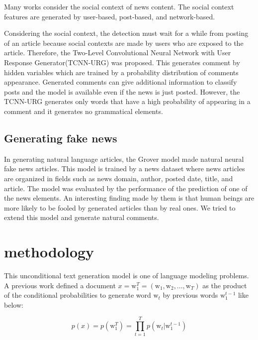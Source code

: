 \documentclass[conference]{IEEEtran}
\begin{document}
Many works consider the social context of news content.
The social context features are generated by user-based\cite{Castillo:2011:ICT:1963405.1963500,8397048,DBLP:journals/corr/abs-1904-13355}, 
post-based\cite{Yang2019UnsupervisedFN,Tacchini2017SomeLI,Jin:2016:NVE:3016100.3016318},
 and network-based\cite{Wu:2018:TFF:3159652.3159677,DBLP:journals/corr/abs-1902-06673}.

Considering the social context, the detection must wait for a while from posting of an article because social contexts are made by users who are exposed to the article.
Therefore, the Two-Level Convolutional Neural Network with User Response Generator(TCNN-URG) was proposed\cite{ijcai2018-533}.
This generates comment by hidden variables which are trained by a probability distribution of comments appearance.
Generated comments can give additional information to classify posts and the model is available even if the news is just posted.
However, the TCNN-URG generates only words that have a high probability of appearing in a comment and it generates no grammatical elements.

\subsection{Generating fake news}
\label{subsec:generate}
In generating natural language articles, the Grover model made natural neural fake news articles\cite{NIPS2019_9106}.
This model is trained by a news dataset where news articles are organized in fields such as news domain, author, posted date, title, and article.
The model was evaluated by the performance of the prediction of one of the news elements.
An interesting finding made by them is that human beings are more likely to be fooled by generated articles than by real ones.
We tried to extend this model and generate natural comments.


\section{methodology}
This unconditional text generation model is one of language modeling problems.
A previous work\cite{10.5555/944919.944966} defined a document
$x = \mathrm{w}_1^T = (\mathrm{w}_1, \mathrm{w}_2, ..., \mathrm{w}_T)$
as the product of the conditional probabilities to generate word $\mathrm{w}_t$
by previous words $ \mathrm{w}_1^{t-1}$ like below:

\begin{equation}
    \label{eq:generate}
    p(x) = p(\mathrm{w}_1^T) = \prod_{t=1}^{T} p(\mathrm{w}_t|\mathrm{w}_1^{t-1})
\end{equation}
\end{document}
